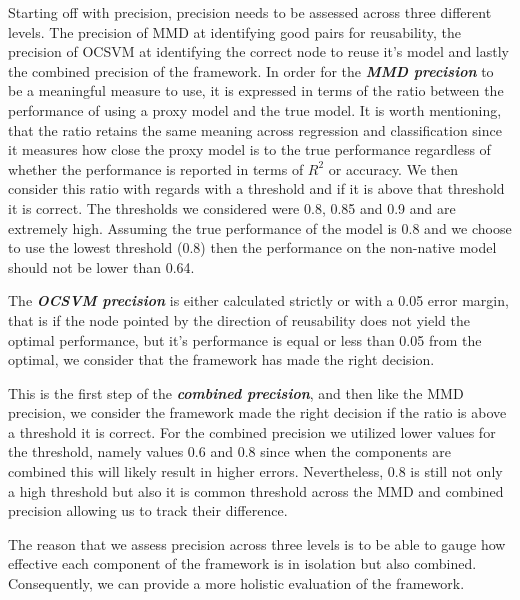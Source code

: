 \documentclass{mpaper}
\begin{document}
Starting off with precision, precision needs to be assessed across three different levels. The precision of MMD at identifying good pairs for reusability, the precision of OCSVM at identifying the correct node to reuse it's model and lastly the combined precision of the framework. In order for the \textbf{\textit{MMD precision}} to be a meaningful measure to use, it is expressed in terms of the ratio between the performance of using a proxy model and the true model. It is worth mentioning, that the ratio retains the same meaning across regression and classification since it measures how close the proxy model is to the true performance regardless of whether the performance is reported in terms of $R^2$ or accuracy. We then consider this ratio with regards with a threshold and if it is above that threshold it is correct. The thresholds we considered were 0.8, 0.85 and 0.9 and are extremely high. Assuming the true performance of the model is 0.8 and we choose to use the lowest threshold (0.8) then the performance on the non-native model should not be lower than 0.64. 

The \textbf{\textit{OCSVM precision}} is either calculated strictly or with a 0.05 error margin, that is if the node pointed by the direction of reusability does not yield the optimal performance, but it's performance is equal or less than 0.05 from the optimal, we consider that the framework has made the right decision.  

This is the first step of the \textbf{\textit{combined precision}}, and  then like the MMD precision, we consider the framework made the right decision if the ratio is above a threshold it is correct. For the combined precision we utilized lower values for the threshold, namely values 0.6 and 0.8 since when the components are combined this will likely result in higher errors. Nevertheless, 0.8 is still not only a high threshold but also it is common threshold across the MMD and combined precision allowing us to track their difference. 

The reason that we assess precision across three levels is to be able to gauge how effective each component of the framework is in isolation but also combined. Consequently, we can provide a more holistic evaluation of the framework. 
\end{document}
